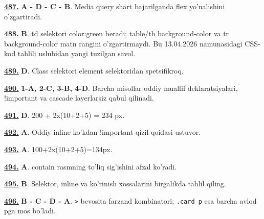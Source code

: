 \documentclass[10pt,a4paper,oneside]{article}
\begin{document}
\par\vspace{3mm}
\noindent\hyperlink{q487}{\textbf{487.}} \textbf{A - D - C - B}.  Media query shart bajarilganda flex yo'nalishini o'zgartiradi.
\par\vspace{3mm}
\noindent\hyperlink{q488}{\textbf{488.}} \textbf{B}.  td selektori color:green beradi; table/th background-color va tr background-color matn rangini o'zgartirmaydi. Bu 13.04.2026 namunasidagi CSS-kod tahlili uslubidan yangi tuzilgan savol.
\par\vspace{3mm}
\noindent\hyperlink{q489}{\textbf{489.}} \textbf{D}.  Class selektori element selektoridan spetsifikroq.
\par\vspace{3mm}
\noindent\hyperlink{q490}{\textbf{490.}} \textbf{1-A, 2-C, 3-B, 4-D}.  Barcha misollar oddiy muallif deklaratsiyalari, !important va cascade layerlarsiz qabul qilinadi.
\par\vspace{3mm}
\noindent\hyperlink{q491}{\textbf{491.}} \textbf{D}.  200 + 2x(10+2+5) = 234 px.
\par\vspace{3mm}
\noindent\hyperlink{q492}{\textbf{492.}} \textbf{A}.  Oddiy inline ko'kdan !important qizil qoidasi ustuvor.
\par\vspace{3mm}
\noindent\hyperlink{q493}{\textbf{493.}} \textbf{A}.  100+2x(10+2+5)=134px.
\par\vspace{3mm}
\noindent\hyperlink{q494}{\textbf{494.}} \textbf{A}.  contain rasmning to'liq sig'ishini afzal ko'radi.
\par\vspace{3mm}
\noindent\hyperlink{q495}{\textbf{495.}} \textbf{B}.  Selektor, inline va ko'rinish xossalarini birgalikda tahlil qiling.
\par\vspace{3mm}
\noindent\hyperlink{q496}{\textbf{496.}} \textbf{B - C - D - A}.  \texttt{\textgreater{}} bevosita farzand kombinatori; \texttt{.card p} esa barcha avlod pga mos bo'ladi.
\par\vspace{3mm}
\end{document}

